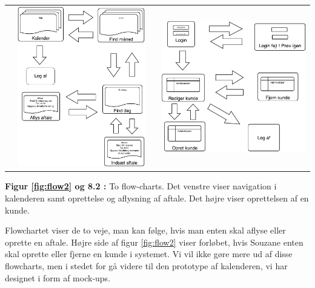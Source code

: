 \documentclass[12pt]{article}   %
\begin{document}
\begin{table}[ht]
\centering
\begin{tabular}{l | r}
\includegraphics[height=7cm,width=7cm]{flow2.pdf}
\label{fig:flow2}&
\includegraphics[height=7cm, width=7cm]{flow3.pdf}
\\
\end{tabular}
\label{tab:gt}
\end{table}
\begin{centering} \textbf{Figur \ref{fig:flow2} og 8.2 :} To flow-charts. Det venstre viser navigation i kalenderen samt oprettelse og aflysning af aftale. Det højre viser oprettelsen af en kunde. 
\end{centering}

\vspace{0.5cm}

Flowchartet viser de to veje, man kan følge, hvis man enten skal aflyse eller oprette en aftale. Højre side af figur \ref{fig:flow2} viser forløbet, hvis Souzane enten skal oprette eller fjerne en kunde i systemet. Vi vil ikke gøre mere ud af disse flowcharts, men i stedet for gå videre til den prototype af kalenderen, vi har designet i form af mock-ups. \\
\end{document}
